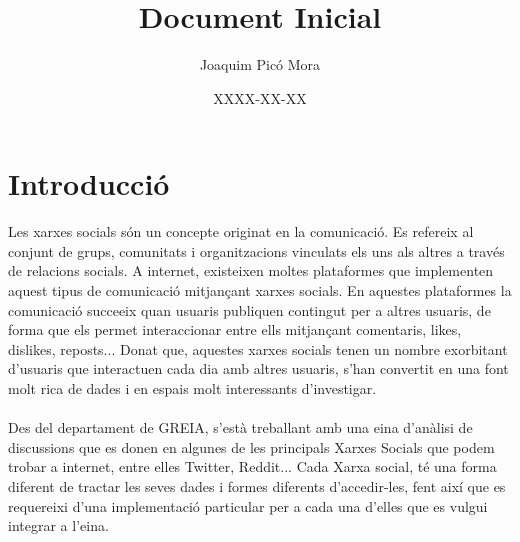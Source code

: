 \documentclass{article}
\title{Document Inicial}
\author{Joaquim Picó Mora}
\date{XXXX-XX-XX}
\begin{document}
	\tableofcontents
	\newpage
	\section{Introducció}
	Les xarxes socials són un concepte originat en la comunicació.
	Es refereix al conjunt de grups, comunitats i organitzacions vinculats
	els uns als altres a través de relacions socials. A internet,
	existeixen moltes plataformes que implementen aquest tipus de
	comunicació mitjançant xarxes socials.
	En aquestes plataformes la comunicació succeeix quan usuaris
	publiquen contingut per a altres usuaris,
	de forma que els permet interaccionar entre ells mitjançant
	comentaris, likes, dislikes, reposts...
	Donat que, aquestes xarxes socials tenen un nombre exorbitant
	d'usuaris que interactuen cada dia amb altres usuaris, s'han convertit
	en una font molt rica de dades i en espais molt interessants d'investigar.\\\\
	Des del departament de GREIA, s'està treballant amb una eina
	d'anàlisi de discussions que es donen en algunes de les principals
	Xarxes Socials que podem trobar a internet, entre elles Twitter, Reddit...
	Cada Xarxa social, té una forma diferent de tractar les seves dades
	i formes diferents d'accedir-les, fent així que es requereixi
	d'una implementació particular per a cada una d'elles que es vulgui
	integrar a l'eina.
\end{document}
